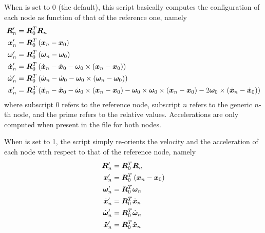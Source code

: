 When  is set to 0 (the default),
this script basically computes the configuration of each node
as function of that of the reference one, namely
\begin{align}
	\boldsymbol{R}_n' &= \boldsymbol{R}_0^T \boldsymbol{R}_n \\
	\boldsymbol{x}_n' &= \boldsymbol{R}_0^T\left( \boldsymbol{x}_n - \boldsymbol{x}_0 \right) \\
	\boldsymbol{\omega}_n' &= \boldsymbol{R}_0^T\left( \boldsymbol{\omega}_n - \boldsymbol{\omega}_0 \right) \\
	\dot{\boldsymbol{x}}_n' &= \boldsymbol{R}_0^T\left( \dot{\boldsymbol{x}}_n - \dot{\boldsymbol{x}}_0 - \boldsymbol{\omega}_0\times\left( \boldsymbol{x}_n - \boldsymbol{x}_0 \right) \right) \\
	\dot{\boldsymbol{\omega}}_n' &= \boldsymbol{R}_0^T\left( 
		\dot{\boldsymbol{\omega}}_n - \dot{\boldsymbol{\omega}}_0 - \boldsymbol{\omega}_0\times\left( \boldsymbol{\omega}_n - \boldsymbol{\omega}_0 \right)
	 \right) \\
	\ddot{\boldsymbol{x}}_n' &= \boldsymbol{R}_0^T\left( 
		\ddot{\boldsymbol{x}}_n - \ddot{\boldsymbol{x}}_0
		- \dot{\boldsymbol{\omega}}_0\times\left( \boldsymbol{x}_n - \boldsymbol{x}_0 \right)
		- \boldsymbol{\omega}_0\times\boldsymbol{\omega}_0\times\left( \boldsymbol{x}_n - \boldsymbol{x}_0 \right)
		- 2 \boldsymbol{\omega}_0\times\left( \dot{\boldsymbol{x}}_n - \dot{\boldsymbol{x}}_0 \right)
	 \right)
\end{align}
where subscript $0$ refers to the reference node,
subscript $n$ refers to the generic $n$-th node,
and the prime refers to the relative values.
Accelerations are only computed when present in the  file
for both nodes.

When  is set to 1, the script simply re-orients
the velocity and the acceleration of each node with respect
to that of the reference node, namely
\begin{align}
	\boldsymbol{R}_n' &= \boldsymbol{R}_0^T \boldsymbol{R}_n \\
	\boldsymbol{x}_n' &= \boldsymbol{R}_0^T\left( \boldsymbol{x}_n - \boldsymbol{x}_0 \right) \\
	\boldsymbol{\omega}_n' &= \boldsymbol{R}_0^T \boldsymbol{\omega}_n \\
	\dot{\boldsymbol{x}}_n' &= \boldsymbol{R}_0^T \dot{\boldsymbol{x}}_n \\
	\dot{\boldsymbol{\omega}}_n' &= \boldsymbol{R}_0^T \dot{\boldsymbol{\omega}}_n \\
	\ddot{\boldsymbol{x}}_n' &= \boldsymbol{R}_0^T \ddot{\boldsymbol{x}}_n
\end{align}

